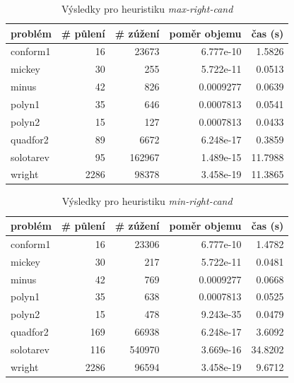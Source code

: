 {\begin{table}[H]
\centering
\begin{tabular}{lrrrr}
\hline
problém & \# půlení & \# zúžení & poměr objemu & čas (s) \\ \hline
conform1 & 16 & 23673 & 6.777e-10 & 1.5826 \\
mickey & 30 & 255 & 5.722e-11 & 0.0513 \\
minus & 42 & 826 & 0.0009277 & 0.0639 \\
polyn1 & 35 & 646 & 0.0007813 & 0.0541 \\
polyn2 & 15 & 127 & 0.0007813 & 0.0433 \\
quadfor2 & 89 & 6672 & 6.248e-17 & 0.3859 \\
solotarev & 95 & 162967 & 1.489e-15 & 11.7988 \\
wright & 2286 & 98378 & 3.458e-19 & 11.3865 \\
\end{tabular}
\caption{Výsledky pro heuristiku \emph{max-right-cand}}
\label{max-right-cand}
\end{table}



\begin{table}[H]
\centering
\begin{tabular}{lrrrr}
\hline
problém & \# půlení & \# zúžení & poměr objemu & čas (s) \\ \hline
conform1 & 16 & 23306 & 6.777e-10 & 1.4782 \\
mickey & 30 & 217 & 5.722e-11 & 0.0481 \\
minus & 42 & 769 & 0.0009277 & 0.0668 \\
polyn1 & 35 & 638 & 0.0007813 & 0.0525 \\
polyn2 & 15 & 478 & 9.243e-35 & 0.0479 \\
quadfor2 & 169 & 66938 & 6.248e-17 & 3.6092 \\
solotarev & 116 & 540970 & 3.669e-16 & 34.8202 \\
wright & 2286 & 96594 & 3.458e-19 & 9.6712 \\
\end{tabular}
\caption{Výsledky pro heuristiku \emph{min-right-cand}}
\label{min-right-cand}
\end{table}



}
